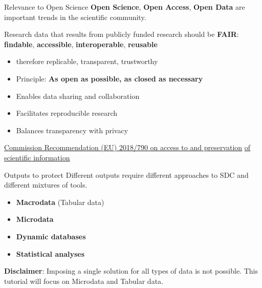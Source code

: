 \documentclass[
	11pt, %
]{beamer}
\begin{document}
\begin{frame}{Relevance to Open Science}
\label{relevance-to-open-science}
\textbf{Open Science}, \textbf{Open Access}, \textbf{Open Data} are
important trends in the scientific community.

Research data that results from publicly funded research should be
\textbf{FAIR}: \newline \textbf{findable}, \textbf{accessible},
\textbf{interoperable}, \textbf{reusable}

\begin{itemize}
\item
  therefore replicable, transparent, trustworthy
\item
  Principle: \textbf{As open as possible, as closed as necessary}
\item
  Enables data sharing and collaboration
\item
  Facilitates reproducible research
\item
  Balances transparency with privacy
\end{itemize}

\href{https://eur-lex.europa.eu/eli/reco/2018/790/oj}{\color{blue}\underline{Commission Recommendation (EU) 2018/790 on access to and preservation}}
\href{https://eur-lex.europa.eu/eli/reco/2018/790/oj}{\color{blue}\underline{of scientific information}}
\end{frame}

\begin{frame}{Outputs to protect}
\label{outputs-to-protect}
Different outputs require different approaches to SDC and different
mixtures of tools.

\begin{itemize}
\tightlist
\item
  \textbf{Macrodata} (Tabular data)
\item
  \textbf{Microdata}
\item
  \textbf{Dynamic databases}
\item
  \textbf{Statistical analyses}
\end{itemize}

\vspace{1cm}

\textbf{Disclaimer}: Imposing a single solution for all types of data is
not possible. \newline This tutorial will focus on Microdata and Tabular
data.
\end{frame}
\end{document}
